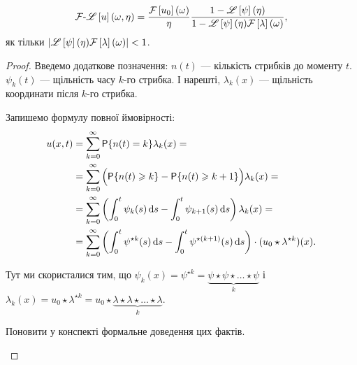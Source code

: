 \begin{th_formula}
    \begin{equation}
        \mathcal{F}\text{-}\mathscr{L}\left[u\right](\omega, \eta) = \frac{\mathcal{F}\left[u_0\right](\omega)}{\eta} \frac{1 - \mathscr{L}\left[\psi\right](\eta)}{1 - \mathscr{L}\left[\psi\right](\eta) \mathcal{F}\left[\lambda\right](\omega)},
    \end{equation}
    як тільки $|\mathscr{L}\left[\psi\right](\eta) \mathcal{F}\left[\lambda\right](\omega)| < 1$.
\end{th_formula}
\begin{proof}
    Введемо додаткове позначення: $n(t)$ --- кількість стрибків до моменту $t$. $\psi_k(t)$ --- щільність часу $k$-го стрибка. І нарешті, $\lambda_k(x)$ --- щільність координати після $k$-го стрибка. \medskip

    Запишемо формулу повної ймовірності:
    \begin{equation}
        \begin{aligned}
            u(x, t)
            &= \sum_{k = 0}^\infty \mathsf{P}\{n(t) = k\} \lambda_k (x) = \\
            &= \sum_{k = 0}^\infty \Big(\mathsf{P}\{n(t) \geqslant k\} - \mathsf{P}\{n(t) \geqslant k + 1\}\Big) \lambda_k (x) = \\
            &= \sum_{k = 0}^\infty \left( \int_0^t \psi_k(s) \mathop{}\!\mathrm{d} s - \int_0^t \psi_{k + 1} (s) \mathop{}\!\mathrm{d} s \right) \lambda_k (x) = \\
            &= \sum_{k = 0}^\infty \left( \int_0^t \psi^{\star k}(s) \mathop{}\!\mathrm{d} s - \int_0^t \psi^{\star(k + 1)} (s) \mathop{}\!\mathrm{d} s \right) \cdot (u_0 \star \lambda^{\star k}) (x).
        \end{aligned}
    \end{equation}

    \begin{remark}
        Тут ми скористалися тим, що $\psi_k(x) = \psi^{\star k} = \underset{k}{\underbrace{\psi \star \psi \star \ldots \star \psi}}$ і $\lambda_k(x) = u_0 \star \lambda^{\star k} = u_0 \star \underset{k}{\underbrace{\lambda \star \lambda \star \ldots \star \lambda}}$.
    \end{remark}
    
    \begin{exercise}
        Поновити у конспекті формальне доведення цих фактів.
    \end{exercise}


\end{proof}
